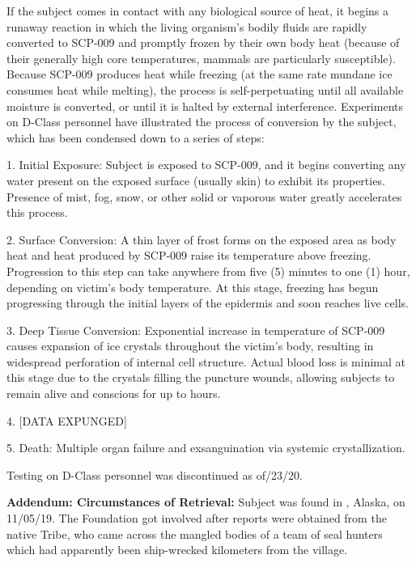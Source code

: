 If the subject comes in contact with any biological source of heat, it begins a runaway reaction in which the living organism's bodily fluids are rapidly converted to SCP-009 and promptly frozen by their own body heat (because of their generally high core temperatures, mammals are particularly susceptible). Because SCP-009 produces heat while freezing (at the same rate mundane ice consumes heat while melting), the process is self-perpetuating until all available moisture is converted, or until it is halted by external interference.
\newpage
Experiments on D-Class personnel have illustrated the process of conversion by the subject, which has been condensed down to a series of steps:

1. Initial Exposure: Subject is exposed to SCP-009, and it begins converting any water present on the exposed surface (usually skin) to exhibit its properties. Presence of mist, fog, snow, or other solid or vaporous water greatly accelerates this process.

2. Surface Conversion: A thin layer of frost forms on the exposed area as body heat and heat produced by SCP-009 raise its temperature above freezing. Progression to this step can take anywhere from five (5) minutes to one (1) hour, depending on victim's body temperature. At this stage, freezing has begun progressing through the initial layers of the epidermis and soon reaches live cells.

3. Deep Tissue Conversion: Exponential increase in temperature of SCP-009 causes expansion of ice crystals throughout the victim's body, resulting in widespread perforation of internal cell structure. Actual blood loss is minimal at this stage due to the crystals filling the puncture wounds, allowing subjects to remain alive and conscious for up to  hours.

4. [DATA EXPUNGED]

5. Death: Multiple organ failure and exsanguination via systemic crystallization.

Testing on D-Class personnel was discontinued as of/23/20.

\textbf{Addendum: Circumstances of Retrieval:} Subject was found in , Alaska, on 11/05/19. The Foundation got involved after reports were obtained from the native  Tribe, who came across the mangled bodies of a team of seal hunters which had apparently been ship-wrecked  kilometers from the village.

